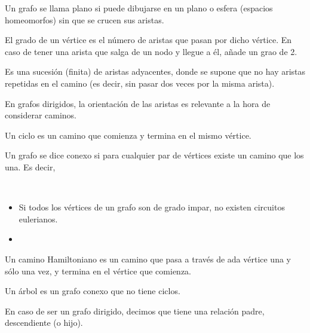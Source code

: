 \begin{definicion}
    Un grafo se llama plano si puede dibujarse en un plano o esfera (espacios homeomorfos) sin que se crucen sus aristas.
\end{definicion}

\begin{defincion}
    El grado de un vértice es el número de aristas que pasan por dicho vértice.
    En caso de tener una arista que salga de un nodo y llegue a él, añade un grao de 2.
\end{defincion}

\begin{definicion}[Camino]
    Es una sucesión (finita) de aristas adyacentes, donde se supone que no hay aristas repetidas en el camino (es decir, sin pasar dos veces por la misma arista).
\end{definicion}
En grafos dirigidos, la orientación de las aristas es relevante a la hora de considerar caminos.

\begin{definicion}[Ciclo]
   Un ciclo es un camino que comienza y termina en el mismo vértice. 
\end{definicion}

\begin{definicion}
    Un grafo se dice conexo si para cualquier par de vértices existe un camino que los una. Es decir, 
\end{definicion}

\begin{teo}
    \ 
    \begin{itemize}
        \item Si todos los vértices de un grafo son de grado impar, no existen circuitos eulerianos.
        \item 
    \end{itemize}
    
\end{teo}

\begin{definicion}
    Un camino Hamiltoniano es un camino que pasa a través de ada vértice una y sólo una vez, y termina en el vértice que comienza.
\end{definicion}

\begin{definicion}
    Un árbol es un grafo conexo que no tiene ciclos.
\end{definicion}
En caso de ser un grafo dirigido, decimos que tiene una relación padre, descendiente (o hijo).

